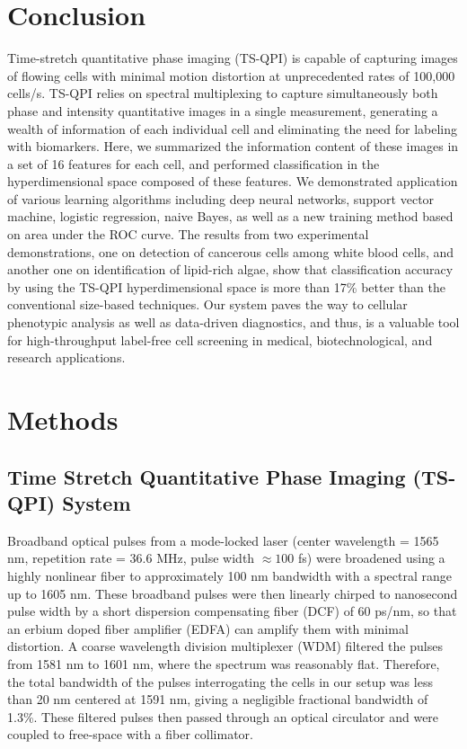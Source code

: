 \documentclass[aps,pra,reprint,superscriptaddress]{revtex4-1}
\begin{document}
\section*{Conclusion}

Time-stretch quantitative phase imaging (TS-QPI) is capable of capturing images of flowing cells with minimal motion distortion at unprecedented rates of 100,000 cells/s. TS-QPI relies on spectral multiplexing to capture simultaneously both phase and intensity quantitative images in a single measurement, generating a wealth of information of each individual cell and eliminating the need for labeling with biomarkers. Here, we summarized the information content of these images in a set of 16 features for each cell, and performed classification in the hyperdimensional space composed of these features. We demonstrated application of various learning algorithms including deep neural networks, support vector machine, logistic regression, naive Bayes, as well as a new training method based on area under the ROC curve. The results from two experimental demonstrations, one on detection of cancerous cells among white blood cells, and another one on identification of lipid-rich algae, show that classification accuracy by using the TS-QPI hyperdimensional space is more than 17\% better than the conventional size-based techniques. Our system paves the way to cellular phenotypic analysis as well as data-driven diagnostics, and thus, is a valuable tool for high-throughput label-free cell screening in medical, biotechnological, and research applications.

\section*{\label{scn:Methods} Methods}

\subsection*{Time Stretch Quantitative Phase Imaging (TS-QPI) System}

Broadband optical pulses from a mode-locked laser (center wavelength = 1565 nm, repetition rate = 36.6 MHz, pulse width $\approx100$ fs) were broadened using a highly nonlinear fiber to approximately 100 nm bandwidth with a spectral range up to 1605 nm. These broadband pulses were then linearly chirped to nanosecond pulse width by a short dispersion compensating fiber (DCF) of 60 ps/nm, so that an erbium doped fiber amplifier (EDFA) can amplify them with minimal distortion. A coarse wavelength division multiplexer (WDM) filtered the pulses from 1581 nm to 1601 nm, where the spectrum was reasonably flat. Therefore, the total bandwidth of the pulses interrogating the cells in our setup was less than 20 nm centered at 1591 nm, giving a negligible fractional bandwidth of 1.3\%. These filtered pulses then passed through an optical circulator and were coupled to free-space with a fiber collimator.
\end{document}
